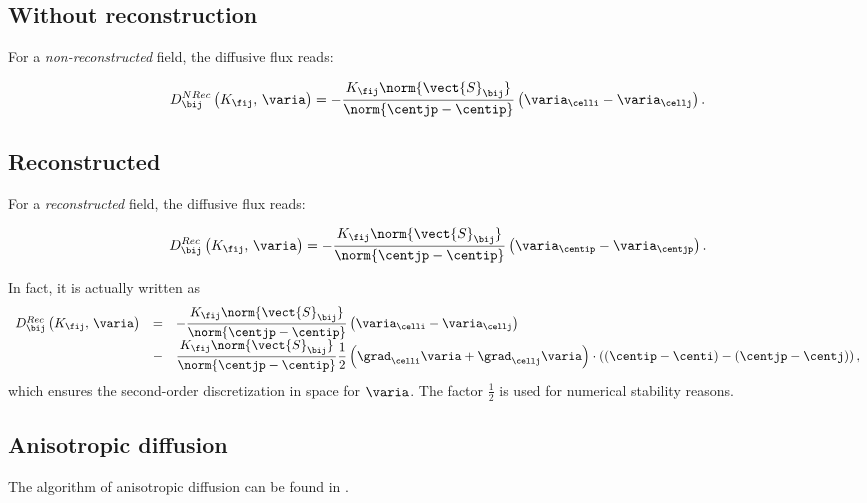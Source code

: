 \subsection{Without reconstruction}
For a \emph{non-reconstructed} field, the diffusive flux reads:

\begin{equation}
D_{\bij}^{NRec} \left( K_{\fij} , \, \varia \right)  =  - \dfrac{K_{\fij} \norm{\vect{S}_{\bij}}}{\norm{\centjp - \centip} } \left( \varia_{\celli} - \varia_{\cellj}\right).
\end{equation}


\subsection{Reconstructed}
For a \emph{reconstructed} field, the diffusive flux reads:

\begin{equation}
D_{\bij}^{Rec} \left( K_{\fij} , \, \varia \right)  =  - \dfrac{K_{\fij} \norm{\vect{S}_{\bij}}}{\norm{\centjp - \centip} } \left( \varia_{\centip} - \varia_{\centjp} \right).
\end{equation}

\begin{remark}
In fact, it is actually written as
%
\begin{equation}
\begin{array}{r c l}
D_{\bij}^{Rec} \left( K_{\fij} , \, \varia \right)  &=&  - \dfrac{K_{\fij} \norm{\vect{S}_{\bij}}}{\norm{\centjp - \centip} } \left( \varia_{\celli} - \varia_{\cellj} \right) \\
&-& \dfrac{K_{\fij} \norm{\vect{S}_{\bij}}}{\norm{\centjp - \centip} }  \dfrac{1}{2}\left( \grad_{\celli} \varia + \grad_{\cellj} \varia \right) \cdot \left( \left(\centip - \centi\right) - \left(\centjp - \centj\right) \right),
\end{array}
\end{equation}
%
which ensures the second-order discretization in space for $\varia$.
The factor $ \frac{1}{2}$ is used for numerical stability reasons.
\end{remark}

\subsection{Anisotropic diffusion}
The algorithm of anisotropic diffusion can be found in \cite{ferrand2014anisotropic}.

